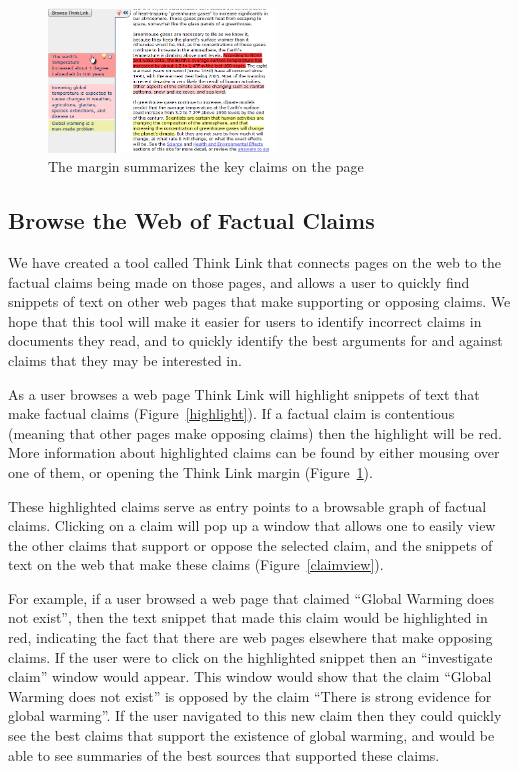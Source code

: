 \documentclass{chi2009}
\begin{document}
\begin{figure}[tb]
	\begin{center}
	\includegraphics[width=6cm]{../screenshots/sidebar_crop.png}
	\caption{The margin summarizes the key claims on the page}
	\label{margin}
	\end{center}
\end{figure}



\subsection{Browse the Web of Factual Claims}

We have created a tool called Think Link that connects pages on the web to the factual claims being made on those pages, and allows a user to quickly find snippets of text on other web pages that make supporting or opposing claims. We hope that this tool will make it easier for users to identify incorrect claims in documents they read, and to quickly identify the best arguments for and against claims that they may be interested in.

As a user browses a web page Think Link will highlight snippets of text that make factual claims (Figure~\ref{highlight}). If a factual claim is contentious (meaning that other pages make opposing claims) then the highlight will be red. More information about highlighted claims can be found by either mousing over one of them, or opening the Think Link margin (Figure~\ref{margin}).

These highlighted claims serve as entry points to a browsable graph of factual claims. Clicking on a claim will pop up a window that allows one to easily view the other claims that support or oppose the selected claim, and the snippets of text on the web that make these claims (Figure~\ref{claimview}).

For example, if a user browsed a web page that claimed ``Global Warming does not exist'', then the text snippet that made this claim would be highlighted in red, indicating the fact that there are web pages elsewhere that make opposing claims. If the user were to click on the highlighted snippet then an ``investigate claim'' window would appear. This window would show that the claim ``Global Warming does not exist'' is opposed by the claim ``There is strong evidence for global warming''. If the user navigated to this new claim then they could quickly see the best claims that support the existence of global warming, and would be able to see summaries of the best sources that supported these claims.
\end{document}
